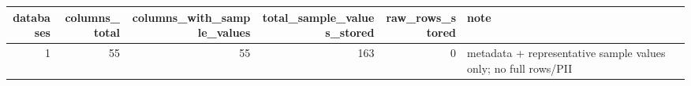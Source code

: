 \begin{tabular}{rrrrrl}
\toprule
databases & columns\_total & columns\_with\_sample\_values & total\_sample\_values\_stored & raw\_rows\_stored & note \\
\midrule
1 & 55 & 55 & 163 & 0 & metadata + representative sample values only; no full rows/PII \\
\bottomrule
\end{tabular}
